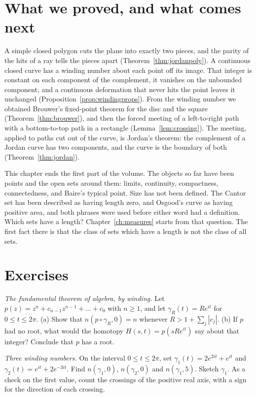 \section{What we proved, and what comes next}

A simple closed polygon cuts the plane into exactly two pieces, and the parity of the hits of a ray tells the pieces apart (Theorem~\ref{thm:jordanpoly}). A continuous closed curve has a winding number about each point off its image. That integer is constant on each component of the complement, it vanishes on the unbounded component, and a continuous deformation that never hits the point leaves it unchanged (Proposition~\ref{prop:windingprops}). From the winding number we obtained Brouwer's fixed-point theorem for the disc and the square (Theorem~\ref{thm:brouwer}), and then the forced meeting of a left-to-right path with a bottom-to-top path in a rectangle (Lemma~\ref{lem:crossing}). The meeting, applied to paths cut out of the curve, is Jordan's theorem: the complement of a Jordan curve has two components, and the curve is the boundary of both (Theorem~\ref{thm:jordan}).

This chapter ends the first part of the volume. The objects so far have been points and the open sets around them: limits, continuity, compactness, connectedness, and Baire's typical point. Size has not been defined. The Cantor set has been described as having length zero, and Osgood's curve as having positive area, and both phrases were used before either word had a definition. Which sets have a length? Chapter~\ref{ch:measures} starts from that question. The first fact there is that the class of sets which have a length is not the class of all sets.

\section{Exercises}

\begin{exercise}[$\star$]\label{ex:ftawind}
\emph{The fundamental theorem of algebra, by winding.} Let $p(z)=z^n+c_{n-1}z^{n-1}+\dots+c_0$ with $n\ge1$, and let $\gamma_R(t)=Re^{it}$ for $0\le t\le2\pi$. (a) Show that $n(p\circ\gamma_R,0)=n$ whenever $R>1+\sum_j|c_j|$.
(b) If $p$ had no root, what would the homotopy $H(s,t)=p(sRe^{it})$ say about that integer? Conclude that $p$ has a root.
\end{exercise}

\begin{exercise}[$\star$]\label{ex:windcompute}
\emph{Three winding numbers.} On the interval $0\le t\le2\pi$, set $\gamma_1(t)=2e^{2it}+e^{it}$ and $\gamma_2(t)=e^{it}+2e^{-3it}$. Find $n(\gamma_1,0)$, $n(\gamma_2,0)$ and $n(\gamma_1,5)$.
Sketch $\gamma_1$. As a check on the first value, count the crossings of the positive real axis, with a sign for the direction of each crossing.
\end{exercise}


